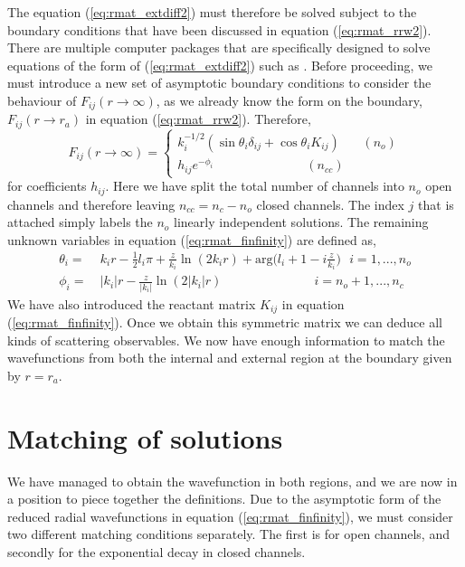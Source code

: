 The equation (\ref{eq:rmat_extdiff2}) must therefore be solved subject to the boundary conditions that have been discussed in equation (\ref{eq:rmat_rrw2}). There are multiple computer packages that are specifically designed to solve equations of the form of (\ref{eq:rmat_extdiff2}) such as \citet{1981CoPhC..23..181C}. Before proceeding, we must introduce a new set of asymptotic boundary conditions to consider the behaviour of $F_{ij}(r\rightarrow\infty)$, as we already know the form on the boundary, $F_{ij}(r\rightarrow r_a)$ in equation (\ref{eq:rmat_rrw2}). Therefore,
\begin{equation}\label{eq:rmat_finfinity}
F_{ij}(r\rightarrow \infty) = \left\{
  \begin{array}{lr}
     k_i^{-1/2}(\sin\theta_i\delta_{ij}+\cos\theta_iK_{ij}) ~~~~~~~~(n_o)\\
    h_{ij}e^{-\phi_i} ~~~~~~~~~~~~~~~~~~~~~~~~~~~~~~~~~(n_{cc})
  \end{array}
\right.
\end{equation}
for coefficients $h_{ij}$. Here we have split the total number of channels into $n_o$ open channels and therefore leaving $n_{cc}=n_c-n_o$ closed channels. The index $j$ that is attached simply labels the $n_o$ linearly independent solutions. The remaining unknown variables in equation (\ref{eq:rmat_finfinity}) are defined as,
\begin{equation}\label{eq:rmat_parameters}
\begin{split}
\theta_i= &~ k_ir-\frac{1}{2}l_i\pi+\frac{z}{k_i}\ln(2k_ir)+\text{arg}\Big(l_i+1-i\frac{z}{k_i}\Big)~~~ i=1,...,n_o\\
\phi_i=&~ |k_i|r-\frac{z}{|k_i|}\ln(2|k_i|r)~~~~~~~~~~~~~~~~~~~~~~~~~~~~~~~~~ i=n_o+1,...,n_c
\end{split}
\end{equation}
We have also introduced the reactant matrix $K_{ij}$ in equation (\ref{eq:rmat_finfinity}). Once we obtain this symmetric matrix we can deduce all kinds of scattering observables. We now have enough information to match the wavefunctions from both the internal and external region at the boundary given by $r=r_a$.

\section{Matching of solutions}\label{sec:matching}
We have managed to obtain the wavefunction in both regions, and we are now in a position to piece together the definitions. Due to the asymptotic form of the reduced radial wavefunctions in equation (\ref{eq:rmat_finfinity}), we must consider two different matching conditions separately. The first is for open channels, and secondly for the exponential decay in closed channels.

